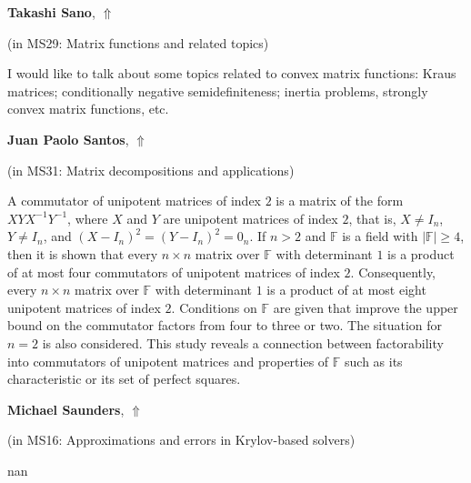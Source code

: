 \documentclass[ILAS2025-program.tex]{subfiles}
\begin{document}
\hypertarget{down0125}{}\begin{ilasabstract}
    
\textbf{Takashi Sano},  \hfill \hyperlink{up0125}{$\Uparrow$}
    
    
(in {\color{mstitle}MS29: Matrix functions and related topics})
        
\mtskip
    I would like to talk about some topics related to convex matrix functions: 
Kraus matrices; conditionally negative semidefiniteness; inertia problems, strongly convex matrix functions, etc. 

\end{ilasabstract}
    

\hypertarget{down0307}{}\begin{ilasabstract}
    
\textbf{Juan Paolo Santos},  \hfill \hyperlink{up0307}{$\Uparrow$}
    
    
(in {\color{mstitle}MS31: Matrix decompositions and applications})
        
\mtskip
    A commutator of unipotent matrices of index $2$ is a matrix of the form $XYX^{-1}Y^{-1}$, where $X$ and $Y$ are unipotent matrices of index $2$, that is, $X \ne I_n$, $Y \ne I_n$, and $(X-I_n)^2=(Y-I_n)^2=0_n$. If $n>2$ and $\mathbb{F}$ is a field with $|\mathbb{F}| \geq 4$, then it is shown that every $n \times n$ matrix over $\mathbb{F}$ with determinant $1$ is a product of at most four commutators of unipotent matrices of index $2$. Consequently, every $n \times n$ matrix over $\mathbb{F}$ with determinant $1$ is a product of at most eight unipotent matrices of index $2$. Conditions on $\mathbb{F}$ are given that improve the upper bound on the commutator factors from four to three or two. The situation for $n=2$ is also considered. This study reveals a connection between factorability into commutators of unipotent matrices and properties of $\mathbb{F}$ such as its characteristic or its set of perfect squares.
\end{ilasabstract}
    

\hypertarget{down0303}{}\begin{ilasabstract}
    
\textbf{Michael Saunders},  \hfill \hyperlink{up0303}{$\Uparrow$}
    
    
(in {\color{mstitle}MS16: Approximations and errors in Krylov-based solvers})
        
\mtskip
    nan
\end{ilasabstract}
    
\end{document}
